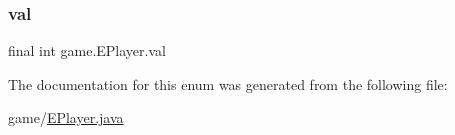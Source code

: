 \subsubsection{\texorpdfstring{val}{val}}
{\footnotesize\ttfamily final int game.\+E\+Player.\+val\hspace{0.3cm}{\ttfamily [private]}}



The documentation for this enum was generated from the following file\+:\begin{DoxyCompactItemize}
\item 
game/\mbox{\hyperlink{_e_player_8java}{E\+Player.\+java}}\end{DoxyCompactItemize}
